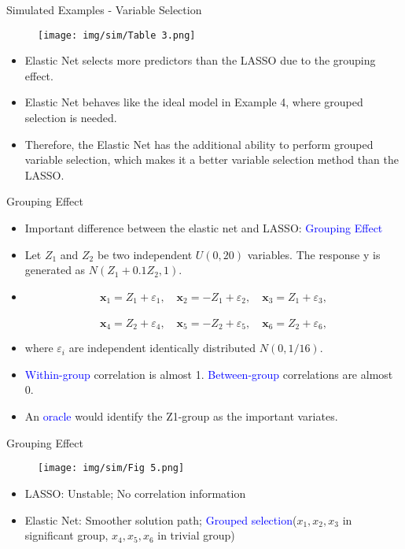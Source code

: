     \begin{frame}{Simulated Examples - Variable Selection}
        \begin{figure}
            \centering
            \texttt{[image: img/sim/Table 3.png]}
        \end{figure}
        \begin{itemize}
            \item Elastic Net selects more predictors than the LASSO due to the grouping effect. 
            \item Elastic Net behaves like the ideal model in Example 4, where grouped selection is needed.
            \item Therefore, the Elastic Net has the additional ability to perform grouped variable selection, which makes it a better variable selection method than the LASSO.

        \end{itemize}
    \end{frame}

    \begin{frame}{Grouping Effect}
        \begin{itemize}
            \item Important difference between the elastic net and LASSO: \textcolor{blue}{Grouping Effect}
            \item Let $Z_1$ and $Z_2$ be two independent $U(0,20)$ variables. The response y is generated as $N(Z_1+0.1Z_2,1).$
            \item $$\mathbf{x}_1=Z_1+\varepsilon_1,\quad\mathbf{x}_2=-Z_1+\varepsilon_2,\quad\mathbf{x}_3=Z_1+\varepsilon_3,$$
            \\$$\mathbf{x}_4=Z_2+\varepsilon_4,\quad\mathbf{x}_5=-Z_2+\varepsilon_5,\quad\mathbf{x}_6=Z_2+\varepsilon_6,$$
            \item where $\varepsilon_{i}$ are independent identically distributed $N(0,1/16).$
            \item \textcolor{blue}{Within-group} correlation is almost 1. \textcolor{blue}{Between-group} correlations are almost 0.
            \item An \textcolor{blue}{oracle} would identify the Z1-group as the important variates.
        \end{itemize}
    \end{frame}

    \begin{frame}{Grouping Effect}
        \begin{figure}
            \centering
            \texttt{[image: img/sim/Fig 5.png]}
            \label{fig:enter-label}
        \end{figure}
        \begin{itemize}
            \item LASSO: Unstable; No correlation information
            \item Elastic Net: Smoother solution path; \textcolor{blue}{Grouped selection}($x_1,x_2,x_3$ in significant group, $x_4,x_5,x_6$ in trivial group)
        \end{itemize}
    \end{frame}
    
